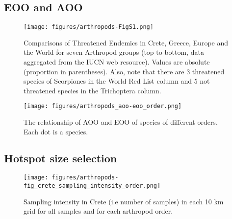     \subsection{EOO and AOO}
    \label{subsec:arthropods-sampling}

   \begin{figure}[htp!]
      \centering
      \texttt{[image: figures/arthropods-FigS1.png]}
      \caption[Comparisons of Threatened Endemics in Crete, Greece, Europe and the World]{Comparisons of Threatened Endemics in Crete, Greece, Europe and the World for seven Arthropod groups (top to bottom, data aggregated from the IUCN web resource). Values are absolute (proportion in parentheses). Also, note that there are 3 threatened species of Scorpiones in the World Red List column and 5 not threatened species in the Trichoptera column.}
      \label{fig:arthropods-figS1}
   \end{figure}


   \begin{figure}[htp!]
      \centering
      \texttt{[image: figures/arthropods\_aoo-eoo\_order.png]}
      \caption[AOO, EOO relationship per order]{The relationship of AOO and EOO of species of different orders. Each dot is a species. }
      \label{fig:arthropods-eoo-aoo}
   \end{figure}


    \subsection{Hotspot size selection}
    \label{subsec:arthropods-grids}


   \begin{figure}[htp!]
      \centering
      \texttt{[image: figures/arthropods-fig\_crete\_sampling\_intensity\_order.png]}
      \caption[Sampling intensity]{Sampling intensity in Crete (i.e number of samples) in each 10 km grid for all samples and for each arthropod order.}
      \label{fig:arthropods-sampling-intesity}
   \end{figure}




